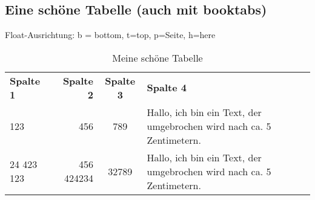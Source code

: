 \documentclass[12pt,ngerman,parskip=half]{scrartcl}
\begin{document}
\blindtext

\subsection{Eine schöne Tabelle (auch mit booktabs)}

Float-Ausrichtung: b = bottom, t=top, p=Seite, h=here

\begin{table}[H]
\caption{Meine schöne Tabelle}\label{tab:erste}
\begin{center}
\begin{tabular}{lrcp{5cm}} \toprule[2pt]
\textbf{Spalte 1} & {\bfseries Spalte 2}  & \textbf{Spalte 3}  & \textbf{Spalte 4}  \\ \cmidrule[1pt](rl){1-4}
123 & 456 & 789  & Hallo, ich bin ein Text, der umgebrochen wird nach ca. 5 Zentimetern. \\ \midrule
24 423 123 & 456 424234 &  32789  & Hallo, ich bin ein Text, der umgebrochen wird nach ca. 5 Zentimetern. \\ \bottomrule[2pt]
\end{tabular} 
\end{center}
\end{table}

\blindtext

\blindtext

\blindtext
\end{document}
